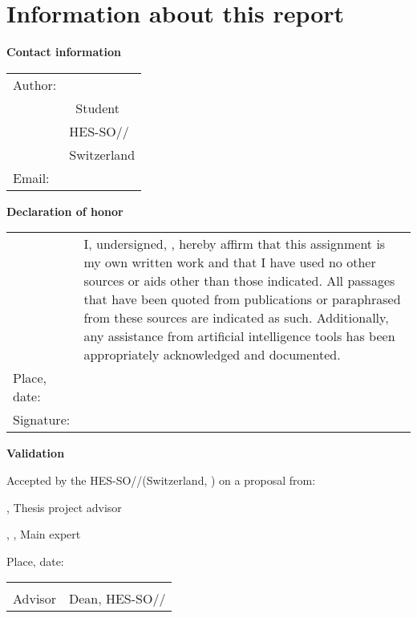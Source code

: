 \chapter*{Information about this report}

\vspace{\fill}

\textbf{Contact information}

\begin{tabularx}{\textwidth}{L{2.5cm}X}
	Author:	 & \AuthorFirstName ~\AuthorLastName \\
	& \Diploma ~Student \\
	& HES-SO//\Diploma \\
	& Switzerland \\
	Email: & \email{\AuthorEmail}
\end{tabularx}

\vspace{\fill}

\textbf{Declaration of honor}

{\renewcommand{\arraystretch}{2}
\begin{tabularx}{\textwidth}{L{2.5cm}X}
	& I, undersigned, \Author, hereby affirm that this assignment is my own written work and that I have used no other sources or aids other than those indicated. All passages that have been quoted from publications or paraphrased from these sources are indicated as such. Additionally, any assistance from artificial intelligence tools has been appropriately acknowledged and documented. \\
	Place, date: & \underline{\hspace{7cm}} \\ 
	Signature: & \underline{\hspace{7cm}}
\end{tabularx}
}

\vspace{\fill}

\textbf{Validation}

Accepted by the HES-SO//\Diploma (Switzerland, \Place) on a proposal from:

\vspace{0.5cm}

\Advisor, Thesis project advisor

\Expert, \ExpertLab, Main expert

\vspace{1cm}

Place, date: \underline{\hspace{8cm}}

\vspace{3cm}

{ \renewcommand{\arraystretch}{1.5}
\begin{tabularx}{\textwidth}{X X}
	\Advisor  & \Dean\\ 
	Advisor   & Dean, HES-SO//\Diploma\\
\end{tabularx}
}